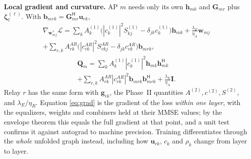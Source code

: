 \documentclass[conference]{IEEEtran}
\newcommand{\abs}[1]{\left\lvert #1 \right\rvert}
\newcommand{\herm}{^{\mathsf{H}}}
\newcommand{\zf}{\boldsymbol{\zeta}_{\mathrm{f}}}
\newcommand{\Loss}{\mathcal{L}}
\begin{document}
\textbf{Local gradient and curvature.} AP $m$ needs only its own
$\mathbf{h}_{mk}$ and $\mathbf{G}_{mr}$ plus $\zf^{(\ell)}$. With
$\mathbf{b}_{mrk} = \mathbf{G}_{mr}\herm\mathbf{u}_{rk}$,
\begin{multline}
\nabla_{\mathbf{w}_{mj}^*}\Loss = \sum_k A^{(1)}_k\bigl(\abs{c^{(1)}_k}^2
S^{(1)}_{kj} - \delta_{jk}c^{(1)}_k\bigr)\mathbf{h}_{mk}
+ \frac{\lambda_E}{\eta_A}\mathbf{w}_{mj}\\
+ \sum_{r,k} A^{AR}_{rk}\bigl(\abs{c^{AR}_{rk}}^2 S^{AR}_{rkj}
 - \delta_{jk}c^{AR}_{rk}\bigr)\mathbf{b}_{mrk},
\label{eq:grad}
\end{multline}
\begin{multline}
\mathbf{Q}_m = \sum_k A^{(1)}_k\abs{c^{(1)}_k}^2\mathbf{h}_{mk}
\mathbf{h}_{mk}\herm \\
+ \sum_{r,k} A^{AR}_{rk}\abs{c^{AR}_{rk}}^2
\mathbf{b}_{mrk}\mathbf{b}_{mrk}\herm + \frac{\lambda_E}{\eta_A}\mathbf{I}.
\label{eq:Q}
\end{multline}
Relay $r$ has the same form with $\mathbf{g}_{rk}$, the Phase~II quantities
$A^{(2)}, c^{(2)}, S^{(2)}$, and $\lambda_E/\eta_R$. Equation
\eqref{eq:grad} is the gradient of the loss \emph{within one layer}, with the
equalizers, weights and combiners held at their MMSE values; by the envelope
theorem this equals the full gradient at that point, and a unit test confirms
it against autograd to machine precision. Training differentiates through the
\emph{whole} unfolded graph instead, including how
$\mathbf{u}_{rk}$, $c_k$ and $\rho_k$ change from layer to layer.
\end{document}
